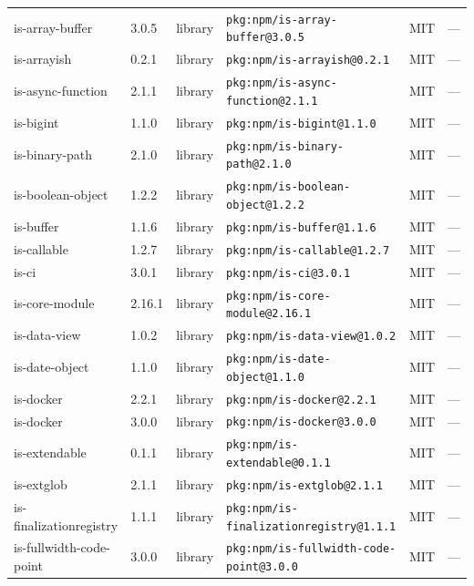 \documentclass[11pt,a4paper]{article}
\begin{document}
\begin{longtable}{|p{4cm}|p{2cm}|p{1.6cm}|p{5cm}|p{1.5cm}|p{3.5cm}|}
\raggedright is-array-buffer & 3.0.5 & library & \small\texttt{pkg:npm/is-array-buffer@3.0.5} & MIT & \small — \\
\raggedright is-arrayish & 0.2.1 & library & \small\texttt{pkg:npm/is-arrayish@0.2.1} & MIT & \small — \\
\raggedright is-async-function & 2.1.1 & library & \small\texttt{pkg:npm/is-async-function@2.1.1} & MIT & \small — \\
\raggedright is-bigint & 1.1.0 & library & \small\texttt{pkg:npm/is-bigint@1.1.0} & MIT & \small — \\
\raggedright is-binary-path & 2.1.0 & library & \small\texttt{pkg:npm/is-binary-path@2.1.0} & MIT & \small — \\
\raggedright is-boolean-object & 1.2.2 & library & \small\texttt{pkg:npm/is-boolean-object@1.2.2} & MIT & \small — \\
\raggedright is-buffer & 1.1.6 & library & \small\texttt{pkg:npm/is-buffer@1.1.6} & MIT & \small — \\
\raggedright is-callable & 1.2.7 & library & \small\texttt{pkg:npm/is-callable@1.2.7} & MIT & \small — \\
\raggedright is-ci & 3.0.1 & library & \small\texttt{pkg:npm/is-ci@3.0.1} & MIT & \small — \\
\raggedright is-core-module & 2.16.1 & library & \small\texttt{pkg:npm/is-core-module@2.16.1} & MIT & \small — \\
\raggedright is-data-view & 1.0.2 & library & \small\texttt{pkg:npm/is-data-view@1.0.2} & MIT & \small — \\
\raggedright is-date-object & 1.1.0 & library & \small\texttt{pkg:npm/is-date-object@1.1.0} & MIT & \small — \\
\raggedright is-docker & 2.2.1 & library & \small\texttt{pkg:npm/is-docker@2.2.1} & MIT & \small — \\
\raggedright is-docker & 3.0.0 & library & \small\texttt{pkg:npm/is-docker@3.0.0} & MIT & \small — \\
\raggedright is-extendable & 0.1.1 & library & \small\texttt{pkg:npm/is-extendable@0.1.1} & MIT & \small — \\
\raggedright is-extglob & 2.1.1 & library & \small\texttt{pkg:npm/is-extglob@2.1.1} & MIT & \small — \\
\raggedright is-finalizationregistry & 1.1.1 & library & \small\texttt{pkg:npm/is-finalizationregistry@1.1.1} & MIT & \small — \\
\raggedright is-fullwidth-code-point & 3.0.0 & library & \small\texttt{pkg:npm/is-fullwidth-code-point@3.0.0} & MIT & \small — \\

\end{longtable}
\end{document}
